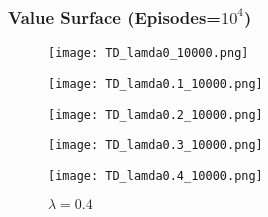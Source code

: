 \documentclass{beamer}
\begin{document}
\begin{frame}
    \frametitle{Value Surface (Episodes=$10^4$)}
    \begin{figure}[ht]
        
        \begin{minipage}[b]{0.15\linewidth}
        \centering
        \texttt{[image: TD\_lamda0\_10000.png]}
        {\caption*{$\lambda = 0.0$}}
        \end{minipage}
        \hspace{0.02 \linewidth}
        \begin{minipage}[b]{0.15\linewidth}
        \centering
        \texttt{[image: TD\_lamda0.1\_10000.png]}
        {\caption*{$\lambda = 0.1$}}
        \end{minipage}
        \hspace{0.02 \linewidth}
        \begin{minipage}[b]{0.15\linewidth}
        \centering
        \texttt{[image: TD\_lamda0.2\_10000.png]}
        {\caption*{$\lambda = 0.2$}}
        \end{minipage}
        \hspace{0.02 \linewidth}
        \begin{minipage}[b]{0.15\linewidth}
        \centering
        \texttt{[image: TD\_lamda0.3\_10000.png]}
        {\caption*{$\lambda = 0.3$}}
        \end{minipage}
        \hspace{0.02 \linewidth}
        \hspace{0.02 \linewidth}
        \begin{minipage}[b]{0.15\linewidth}
        \centering
        \texttt{[image: TD\_lamda0.4\_10000.png]}
        {\caption*{$\lambda = 0.4$}}
        \end{minipage}
        \hspace{0.02 \linewidth}
        

\end{figure}
\end{frame}
\end{document}
